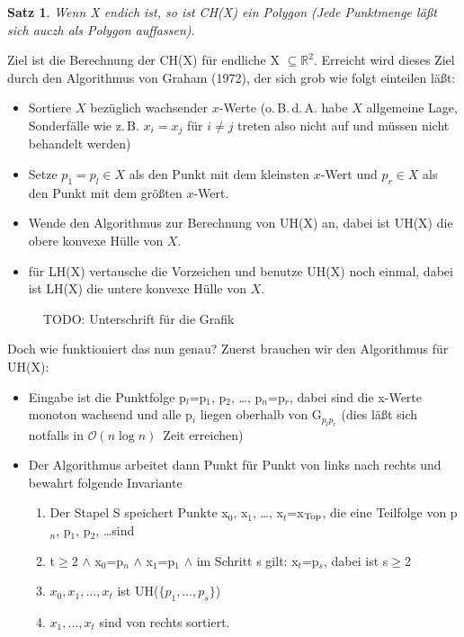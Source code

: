 \documentclass[ngerman,draft,parskip=half*,twoside]{scrreprt}
\theoremstyle{break}
\newtheorem{satz}{Satz}[chapter]
\theoremstyle{nonumberbreak}
\newcommand*{\OO}{\mathcal{O}}      %
\newcommand*{\R}{\mathbb{R}}        %
\begin{document}
\begin{satz}
Wenn X endich ist, so ist CH(X) ein Polygon (Jede Punktmenge läßt sich auczh als Polygon auffassen).
\end{satz}

Ziel ist die Berechnung der CH(X) für endliche X $\subseteq \R^2$. Erreicht wird dieses Ziel durch den Algorithmus von Graham
(1972), der sich grob wie folgt einteilen läßt:

\begin{itemize}
\item Sortiere $X$ bezüglich wachsender $x$-Werte (o.\,B.\,d.\,A. habe
  $X$ allgemeine Lage, Sonderfälle wie z.\,B. $x_i=x_j$ für $i\neq j$ treten
also nicht auf und müssen nicht behandelt werden)
\item Setze $p_1=p_l\in X$ als den Punkt mit dem kleinsten $x$-Wert und $p_r \in X$ als den Punkt mit dem größten $x$-Wert.
\item Wende den Algorithmus zur Berechnung von UH(X) an, dabei ist UH(X) die obere konvexe Hülle von $X$.
\item für LH(X) vertausche die Vorzeichen und benutze UH(X) noch einmal, dabei ist LH(X) die untere konvexe Hülle von $X$.
\end{itemize}

\begin{figure}[H]
  \centering
  \caption{TODO: Unterschrift für die Grafik}
  \label{031203b}
\end{figure}

Doch wie funktioniert das nun genau? Zuerst brauchen wir den Algorithmus für UH(X):
\begin{itemize}
\item Eingabe ist die Punktfolge p$_l$=p$_1$, p$_2$, \ldots, p$_n$=p$_r$, dabei sind die x-Werte monoton wachsend und alle p$_i$ liegen
oberhalb von G$_{p_l p_r}$ (dies läßt sich notfalls in $\OO(n\log n)$~Zeit erreichen)
\item Der Algorithmus arbeitet dann Punkt für Punkt von links nach rechts und bewahrt folgende Invariante
  \begin{enumerate}
  \item Der Stapel S speichert Punkte x$_0$, x$_1$, \ldots, x$_t$=x$_{\textnormal{Top}}$, die eine Teilfolge von p$_n$, p$_1$, p$_2$, \ldots sind
  \item t$\geq$2 $\wedge$ x$_0$=p$_n$ $\wedge$ x$_1$=p$_1$ $\wedge$ im Schritt s gilt: x$_t$=p$_s$, dabei ist s$\geq$2
  \item $x_0, x_1, \ldots, x_t$ ist UH($\{p_1, \ldots, p_s\}$)
  \item $x_1, \ldots, x_t$ sind von rechts sortiert.
  \end{enumerate}
\end{itemize}
\end{document}
